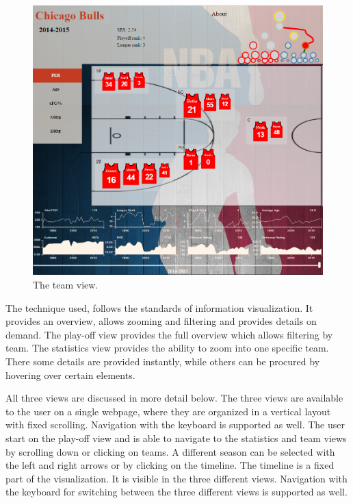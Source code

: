 \documentclass[chi_draft]{sigchi}
\begin{document}
\begin{figure}
\centering
  \includegraphics[width=1.0\columnwidth]{figures/teamview}
  \caption{The team view.}
  \label{fig:teamview}
\end{figure}

The technique used, follows the standards of information visualization. It provides
an overview, allows zooming and filtering and provides details on
demand\cite{mantra,multipleviews,automatingdesign}. The play-off view provides
the full overview which allows filtering by team. The statistics view provides
the ability to zoom into one specific team. There some details are provided
instantly, while others can be procured by hovering over certain elements.

All three views are discussed in more detail below. The three views are
available to the user on a single webpage, where they are organized in a 
vertical layout with fixed scrolling. Navigation with the keyboard is 
supported as well. The user start on the play-off view and is able to 
navigate to the statistics and team views by scrolling down or clicking 
on teams. A different season can be selected with the left and right
arrows or by clicking on the timeline. The timeline is a fixed part of the
visualization. It is visible in the three different views. Navigation 
with the keyboard for switching between the three different views is 
supported as well.
\end{document}

